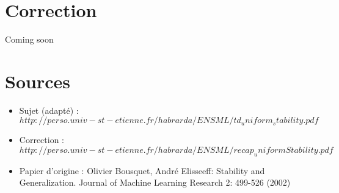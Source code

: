 \documentclass[12pt]{article}
\begin{document}
\section{Correction}
Coming soon

\section{Sources}
\begin{itemize}
\item Sujet (adapté) : $http://perso.univ-st-etienne.fr/habrarda/ENSML/td_uniform_stability.pdf$     
\item Correction : $http://perso.univ-st-etienne.fr/habrarda/ENSML/recap_uniformStability.pdf $       
\item Papier d'origine : 
Olivier Bousquet, André Elisseeff: Stability and Generalization. Journal of Machine Learning Research 2: 499-526 (2002)
\end{itemize}
\end{document}
